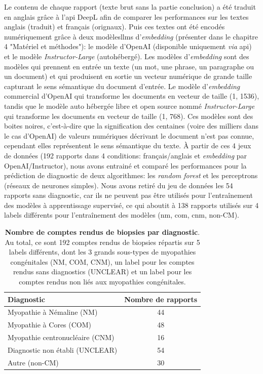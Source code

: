 Le contenu de chaque rapport (texte brut sans la partie conclusion) a été traduit en anglais grâce à l'\gls{api} DeepL afin de comparer les performances sur les textes anglais (traduit) et français (orignaux). Puis ces textes ont été encodés numériquement grâce à deux modèles\gls{llms} d'\textit{embedding} (présenter dans le chapitre 4 "Matériel et méthodes"): le modèle d'OpenAI (disponible uniquement \textit{via} \gls{api}) et le modèle \textit{Instructor-Large} (autohébergé). Les modèles d'\textit{embedding} sont des modèles qui prennent en entrée un texte (un mot, une phrase, un paragraphe ou un document) et qui produisent en sortie un vecteur numérique de grande taille capturant le sens sémantique du document d'entrée. Le modèle d'\textit{embedding} commercial d'OpenAI qui transforme les documents en vecteur de taille (1, 1536), tandis que le modèle auto hébergée libre et open source nommé \textit{Instructor-Large} qui transforme les documents en vecteur de taille (1, 768). Ces modèles sont des boites noires, c'est-à-dire que la signification des centaines (voire des milliers dans le cas d'OpenAI) de valeurs numériques décrivant le document n’est pas connue, cependant elles représentent le sens sémantique du texte.
À partir de ces 4 jeux de données (192 rapports dans 4 conditions: français/anglais et \textit{embedding} par OpenAI/Instructor), nous avons entrainé et comparé les performances pour la prédiction de diagnostic de deux algorithmes: les \textit{random forest} et les perceptrons (réseaux de neurones simples). Nous avons retiré du jeu de données les 54 rapports sans diagnostic, car ils ne peuvent pas être utilisés pour l'entraînement des modèles à apprentissage supervisé, ce qui aboutit à 138 rapports utilisés sur 4 labels différents pour l'entraînement des modèles (\gls{nm}, \gls{com}, \gls{cnm}, non-CM).
\begin{table}[!ht]
\centering
\caption[Nombre de comptes rendus de biopsies par diagnostic]{\textbf{Nombre de comptes rendus de biopsies par diagnostic}. Au total, ce sont 192 comptes rendus de biopsies répartis sur 5 labels différents, dont les 3 grands sous-types de myopathies congénitales (NM, COM, CNM), un label pour les comptes rendus sans diagnostics (UNCLEAR) et un label pour les comptes rendus non liés aux myopathies congénitales.}
\label{tab:number_patients}
\begin{tabular}{|l|c|}
\hline
\textbf{Diagnostic} & \textbf{Nombre de rapports} \\
\hline
Myopathie à Némaline (NM) & 44 \\
\hline
Myopathie à Cores (COM) & 48 \\
\hline
Myopathie centronucléaire (CNM) & 16 \\
\hline
Diagnostic non établi (UNCLEAR) & 54 \\
\hline
Autre (non-CM) & 30 \\
\hline
\end{tabular}
\end{table}

